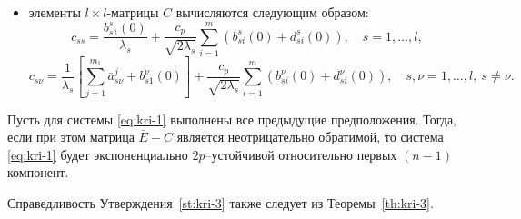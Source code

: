 \begin{itemize}
    \item элементы $l\times l$-матрицы $C$ вычисляются следующим образом:
    \begin{equation*}
    c_{ss} = \frac{b^s_{s1}(0)}{\lambda _s }  +
    \frac{c_p}{\sqrt{2\lambda_s }} \sum\limits_{i=1}^{m} (b^s_{si}(0) +
    d^s_{si} (0)), \quad  s = 1,\dots,l,
    \end{equation*}
    \begin{equation*}
    c_{s\nu} = \frac{1}{\lambda _s } \left [\sum\limits_{j =1}^{m_1}
    \bar a^{j}_{s\nu} + b^\nu_{s1}(0)\right ] +
    \frac{c_p}{\sqrt{2\lambda_s }} \sum\limits_{i=1}^{m} (b^\nu_{si}(0)
    +d^\nu_{si} (0)), \quad s,\nu = 1,\dots,l, \ s \neq \nu.
    \end{equation*}
\end{itemize}

\begin{statement}\label{st:kri-3}
    Пусть для системы \eqref{eq:kri-1} выполнены все
    предыдущие предположения. Тогда, если при этом матрица $\bar E - C$
    является неотрицательно обратимой, то система \eqref{eq:kri-1} будет
    экспоненциально $2p$--устойчивой относительно первых $(n-1)$
    компонент.
\end{statement}

Справедливость Утверждения~\ref{st:kri-3} также следует из Теоремы~\ref{th:kri-3}.
